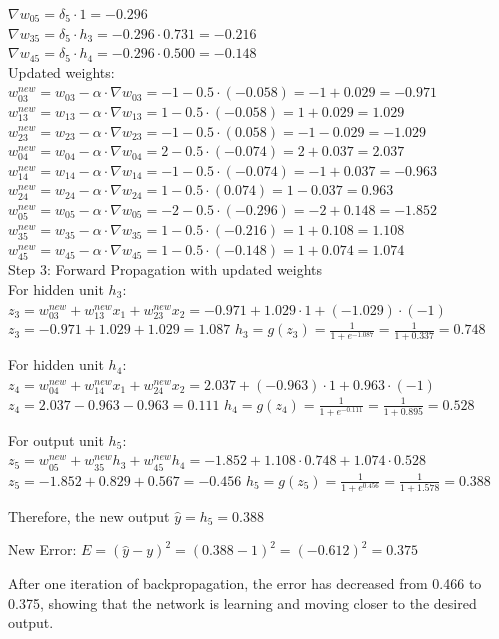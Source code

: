 $\nabla w_{05} =  \delta_5 \cdot 1 = -0.296$\\
$\nabla w_{35} = \delta_5 \cdot h_3 = -0.296 \cdot 0.731 = -0.216$\\
$\nabla w_{45} = \delta_5 \cdot h_4 = -0.296 \cdot 0.500 = -0.148$\\


Updated weights:\\
$w_{03}^{new} = w_{03} - \alpha \cdot \nabla w_{03} = -1 - 0.5 \cdot (-0.058) = -1 + 0.029 = -0.971$\\
$w_{13}^{new} = w_{13} - \alpha \cdot \nabla w_{13} = 1 - 0.5 \cdot (-0.058) = 1 + 0.029 = 1.029$\\

$w_{23}^{new} = w_{23} - \alpha \cdot \nabla w_{23} = -1 - 0.5 \cdot (0.058) = -1 - 0.029 = -1.029$\\
$w_{04}^{new} = w_{04} - \alpha \cdot \nabla w_{04} = 2 - 0.5 \cdot (-0.074) = 2 + 0.037 = 2.037$\\
$w_{14}^{new} = w_{14} - \alpha \cdot \nabla w_{14} = -1 - 0.5 \cdot (-0.074) = -1 + 0.037 = -0.963$\\
$w_{24}^{new} = w_{24} - \alpha \cdot \nabla w_{24} = 1 - 0.5 \cdot (0.074) = 1 - 0.037 = 0.963$\\
$w_{05}^{new} = w_{05} - \alpha \cdot \nabla w_{05} = -2 - 0.5 \cdot (-0.296) = -2 + 0.148 = -1.852$\\
$w_{35}^{new} = w_{35} - \alpha \cdot \nabla w_{35} = 1 - 0.5 \cdot (-0.216) = 1 + 0.108 = 1.108$\\
$w_{45}^{new} = w_{45} - \alpha \cdot \nabla w_{45} = 1 - 0.5 \cdot (-0.148) = 1 + 0.074 = 1.074$\\



Step 3: Forward Propagation with updated weights\\ 
For hidden unit $h_3$: $z_3 = w_{03}^{new} + w_{13}^{new}x_1 + w_{23}^{new}x_2 = -0.971 + 1.029 \cdot 1 + (-1.029) \cdot (-1)$ $z_3 = -0.971 + 1.029 + 1.029 = 1.087$ $h_3 = g(z_3) = \frac{1}{1+e^{-1.087}} = \frac{1}{1+0.337} = 0.748$

For hidden unit $h_4$: $z_4 = w_{04}^{new} + w_{14}^{new}x_1 + w_{24}^{new}x_2 = 2.037 + (-0.963) \cdot 1 + 0.963 \cdot (-1)$ $z_4 = 2.037 - 0.963 - 0.963 = 0.111$ $h_4 = g(z_4) = \frac{1}{1+e^{-0.111}} = \frac{1}{1+0.895} = 0.528$

For output unit $h_5$: $z_5 = w_{05}^{new} + w_{35}^{new}h_3 + w_{45}^{new}h_4 = -1.852 + 1.108 \cdot 0.748 + 1.074 \cdot 0.528$ $z_5 = -1.852 + 0.829 + 0.567 = -0.456$ $h_5 = g(z_5) = \frac{1}{1+e^{0.456}} = \frac{1}{1+1.578} = 0.388$

Therefore, the new output $\hat{y} = h_5 = 0.388$

New Error: $E = (\hat{y} - y)^2 = (0.388 - 1)^2 = (-0.612)^2 = 0.375$

After one iteration of backpropagation, the error has decreased from 0.466 to 0.375, showing that the network is learning and moving closer to the desired output.
\newpage
